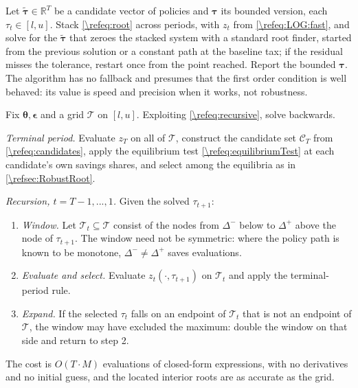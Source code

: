 \begin{alg}
\label{\refalg:LOG:fast}
Let $\tilde{\bm{\tau}} \in \mathbb{R}^{T}$ be a candidate vector of policies and $\bm{\tau}$ its bounded version, each $\tau_t \in [l, u]$. Stack \eqref{\refeq:root} across periods, with $z_t$ from \eqref{\refeq:LOG:fast}, and solve for the $\tilde{\bm{\tau}}$ that zeroes the stacked system with a standard root finder, started from the previous solution or a constant path at the baseline tax; if the residual misses the tolerance, restart once from the point reached. Report the bounded $\bm{\tau}$. The algorithm has no fallback and presumes that the first order condition is well behaved: its value is speed and precision when it works, not robustness.
\end{alg}

\begin{alg}\label{\refalg:LOG:gridsearch}
Fix $\bm{\theta},\bm{\epsilon}$ and a grid $\mathcal{T}$ on $[l,u]$. Exploiting \eqref{\refeq:recursive}, solve backwards.

\smallskip\noindent\emph{Terminal period.} Evaluate $z_T$ on all of $\mathcal{T}$, construct the candidate set $\mathcal{C}_T$ from \eqref{\refeq:candidates}, apply the equilibrium test \eqref{\refeq:equilibriumTest} at each candidate's own savings shares, and select among the equilibria as in \cref{\refsec:RobustRoot}.

\smallskip\noindent\emph{Recursion, $t = T-1,...,1$.} Given the solved $\tau_{t+1}$:
\begin{enumerate}
    \item \emph{Window.} Let $\mathcal{T}_t\subseteq\mathcal{T}$ consist of the nodes from $\Delta^-$ below to $\Delta^+$ above the node of $\tau_{t+1}$. The window need not be symmetric: where the policy path is known to be monotone, $\Delta^-\neq\Delta^+$ saves evaluations.
    \item \emph{Evaluate and select.} Evaluate $z_t(\cdot,\tau_{t+1})$ on $\mathcal{T}_t$ and apply the terminal-period rule.
    \item \emph{Expand.} If the selected $\tau_t$ falls on an endpoint of $\mathcal{T}_t$ that is not an endpoint of $\mathcal{T}$, the window may have excluded the maximum: double the window on that side and return to step 2.
\end{enumerate}
The cost is $O(T\cdot M)$ evaluations of closed-form expressions, with no derivatives and no initial guess, and the located interior roots are as accurate as the grid.
\end{alg}

